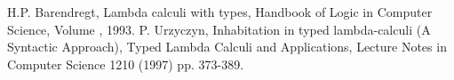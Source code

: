 \begin{thebibliography}{9}
H.P. Barendregt, Lambda calculi with types, Handbook of Logic in Computer Science, Volume , 1993.
P. Urzyczyn, Inhabitation in typed lambda-calculi (A Syntactic Approach), Typed Lambda Calculi
and Applications, Lecture Notes in Computer Science 1210 (1997) pp. 373-389.
\end{thebibliography}